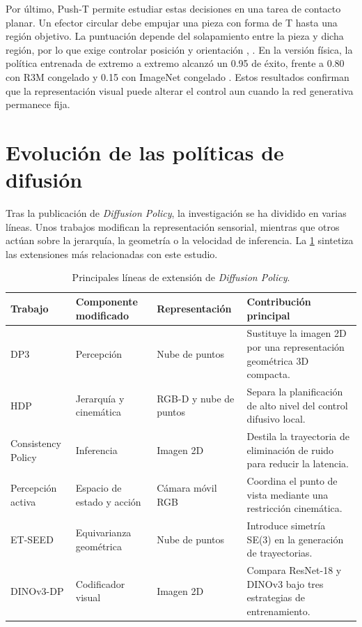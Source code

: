 Por \'ultimo, Push-T permite estudiar estas decisiones en una tarea de contacto
planar. Un efector circular debe empujar una pieza con forma de T hasta una regi\'on
objetivo. La puntuaci\'on depende del solapamiento entre la pieza y dicha regi\'on, por
lo que exige controlar posici\'on y orientaci\'on \cite{florence2021ibc},
\cite{chi2025diffusion}. En la versi\'on f\'isica, la pol\'itica entrenada de extremo a
extremo alcanz\'o un \num{0.95} de \'exito, frente a \num{0.80} con R3M congelado y
\num{0.15} con ImageNet congelado \cite{chi2025diffusion}. Estos resultados confirman
que la representaci\'on visual puede alterar el control aun cuando la red generativa
permanece fija.

\section{Evoluci\'on de las pol\'iticas de difusi\'on}
\label{sec:evolucion-diffusion-policy}

Tras la publicaci\'on de \textit{Diffusion Policy}, la investigaci\'on se ha dividido
en varias l\'ineas. Unos trabajos modifican la representaci\'on sensorial, mientras
que otros act\'uan sobre la jerarqu\'ia, la geometr\'ia o la velocidad de inferencia.
La \cref{tab:evolucion-dp} sintetiza las extensiones m\'as relacionadas con este
estudio.

\begin{table}[htbp]
  \centering
  \small
  \caption{Principales l\'ineas de extensi\'on de \textit{Diffusion Policy}.}
  \label{tab:evolucion-dp}
  \begin{tabular}{>{\raggedright\arraybackslash}p{2.6cm}
                  >{\raggedright\arraybackslash}p{3.2cm}
                  >{\raggedright\arraybackslash}p{3.4cm}
                  >{\raggedright\arraybackslash}p{4.5cm}}
    \toprule
    Trabajo & Componente modificado & Representaci\'on & Contribuci\'on principal \\
    \midrule
    DP3 \cite{ze2024dp3} & Percepci\'on & Nube de puntos & Sustituye la imagen 2D por
    una representaci\'on geom\'etrica 3D compacta. \\
    HDP \cite{ma2024hdp} & Jerarqu\'ia y cinem\'atica & RGB-D y nube de puntos &
    Separa la planificaci\'on de alto nivel del control difusivo local. \\
    Consistency Policy \cite{prasad2024consistency} & Inferencia & Imagen 2D &
    Destila la trayectoria de eliminaci\'on de ruido para reducir la latencia. \\
    Percepci\'on activa \cite{sun2024active} & Espacio de estado y acci\'on & C\'amara
    m\'ovil RGB & Coordina el punto de vista mediante una restricci\'on cinem\'atica. \\
    ET-SEED \cite{tie2025etseed} & Equivarianza geom\'etrica & Nube de puntos &
    Introduce simetr\'ia SE(3) en la generaci\'on de trayectorias. \\
    DINOv3-DP \cite{egbe2025dinov3dp} & Codificador visual & Imagen 2D & Compara
    ResNet-18 y DINOv3 bajo tres estrategias de entrenamiento. \\
    \bottomrule
  \end{tabular}
\end{table}

